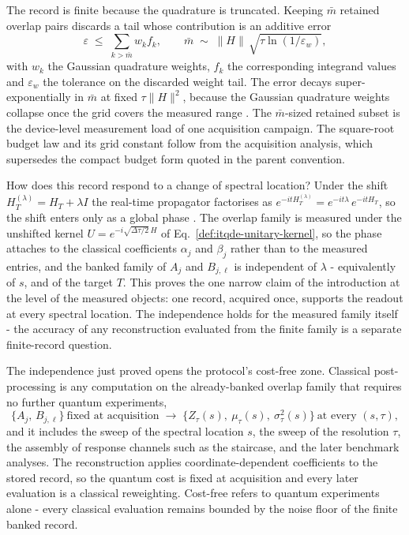 The record is finite because the quadrature is truncated. Keeping $\bar m$ retained overlap pairs discards a tail whose contribution is an additive error
\begin{equation}\label{def:quadrature-truncation-budget}
\varepsilon \;\le\; \sum_{k > \bar m} w_k f_k, \qquad \bar m \;\sim\; \|H\|\,\sqrt{\tau \ln(1/\varepsilon_w)},
\end{equation}
with $w_k$ the Gaussian quadrature weights, $f_k$ the corresponding integrand values and $\varepsilon_w$ the tolerance on the discarded weight tail. The error decays super-exponentially in $\bar m$ at fixed $\tau\|H\|^2$, because the Gaussian quadrature weights collapse once the grid covers the measured range \cite{leamer2024emulation,mccaul2025snacks}. The $\bar m$-sized retained subset is the device-level measurement load of one acquisition campaign. The square-root budget law and its grid constant follow from the acquisition analysis, which supersedes the compact budget form quoted in the parent convention.

How does this record respond to a change of spectral location? Under the shift $H_T^{(\lambda)} = H_T + \lambda I$ the real-time propagator factorises as $e^{-i t H_T^{(\lambda)}} = e^{-i t \lambda}\, e^{-i t H_T}$, so the shift enters only as a global phase \cite{mccaul2025snacks}. The overlap family is measured under the unshifted kernel $U = e^{-i\sqrt{\Delta\tau/2}\,H}$ of Eq.~\eqref{def:itqde-unitary-kernel}, so the phase attaches to the classical coefficients $\alpha_j$ and $\beta_j$ rather than to the measured entries, and the banked family of $A_j$ and $B_{j,\ell}$ is independent of $\lambda$ - equivalently of $s$, and of the target $T$. This proves the one narrow claim of the introduction at the level of the measured objects: one record, acquired once, supports the readout at every spectral location. The independence holds for the measured family itself - the accuracy of any reconstruction evaluated from the finite family is a separate finite-record question.

The independence just proved opens the protocol's cost-free zone. Classical post-processing is any computation on the already-banked overlap family that requires no further quantum experiments,
\begin{equation}\label{def:classical-post-processing}
\{A_j,\, B_{j,\ell}\}\ \text{fixed at acquisition} \;\longrightarrow\; \bigl\{Z_\tau(s),\ \mu_\tau(s),\ \sigma_\tau^2(s)\bigr\}\ \text{at every } (s, \tau),
\end{equation}
and it includes the sweep of the spectral location $s$, the sweep of the resolution $\tau$, the assembly of response channels such as the staircase, and the later benchmark analyses. The reconstruction applies coordinate-dependent coefficients to the stored record, so the quantum cost is fixed at acquisition and every later evaluation is a classical reweighting. Cost-free refers to quantum experiments alone - every classical evaluation remains bounded by the noise floor of the finite banked record.

